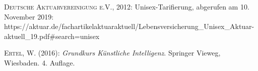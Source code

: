 \begingroup
{}
\renewcommand*\refname{Bibliography}

\begin{thebibliography}{----}

\textsc{Deutsche Aktuarvereinigung e.V.}, 2012: Unisex-Tarifierung, abgerufen am 10. November 2019: https://aktuar.de/fachartikelaktuaraktuell/Lebensversicherung{\_}Unisex{\_}Aktuar-aktuell{\_}19.pdf{\#}search=unisex

\textsc{Ertel}, W. (2016): {\it Grundkurs Künstliche Intelligenz}. Springer Vieweg, Wiesbaden. 4. Auflage.


\end{thebibliography}
\endgroup


\newpage